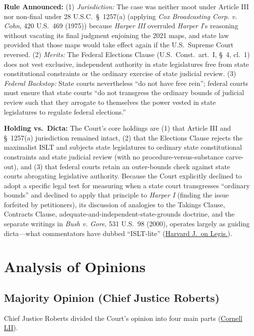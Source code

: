 \documentclass[12pt]{article}
\begin{document}
\textbf{Rule Announced:} (1) \textit{Jurisdiction:} The case was neither moot under Article III nor non-final under 28 U.S.C.\ \S~1257(a) (applying \textit{Cox Broadcasting Corp. v. Cohn}, 420 U.S.\ 469 (1975)) because \textit{Harper III} overruled \textit{Harper I}'s reasoning without vacating its final judgment enjoining the 2021 maps, and state law provided that those maps would take effect again if the U.S.\ Supreme Court reversed. (2) \textit{Merits:} The Federal Elections Clause (U.S.\ Const.\ art.\ I, \S~4, cl.\ 1) does not vest exclusive, independent authority in state legislatures free from state constitutional constraints or the ordinary exercise of state judicial review. (3) \textit{Federal Backstop:} State courts nevertheless ``do not have free rein''; federal courts must ensure that state courts ``do not transgress the ordinary bounds of judicial review such that they arrogate to themselves the power vested in state legislatures to regulate federal elections.''

\textbf{Holding vs.\ Dicta:} The Court's core holdings are (1) that Article III and \S~1257(a) jurisdiction remained intact, (2) that the Elections Clause rejects the maximalist ISLT and subjects state legislatures to ordinary state constitutional constraints and state judicial review (with no procedure-versus-substance carve-out), and (3) that federal courts retain an outer-bounds check against state courts abrogating legislative authority. Because the Court explicitly declined to adopt a specific legal test for measuring when a state court transgresses ``ordinary bounds'' and declined to apply that principle to \textit{Harper I} (finding the issue forfeited by petitioners), its discussion of analogies to the Takings Clause, Contracts Clause, adequate-and-independent-state-grounds doctrine, and the separate writings in \textit{Bush v. Gore}, 531 U.S.\ 98 (2000), operates largely as guiding dicta---what commentators have dubbed ``ISLT-lite'' (\href{https://journals.law.harvard.edu/jol/wp-content/uploads/sites/86/2025/10/Morgan_JOL_Post-Galleys-2.pdf}{Harvard J.\ on Legis.}).

\section{Analysis of Opinions}
\subsection{Majority Opinion (Chief Justice Roberts)}
Chief Justice Roberts divided the Court's opinion into four main parts (\href{https://www.law.cornell.edu/supremecourt/text/21-1271}{Cornell LII}).
\end{document}
